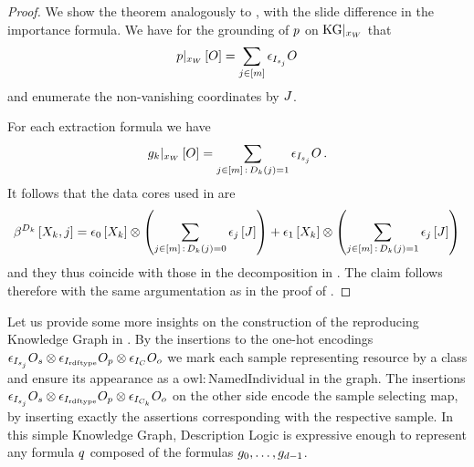 \begin{proof}
    We show the theorem analogously to , with the slide difference in the importance formula.
    We have for the grounding of $p$ on $\mathrm{KG}|_{x_{W}}$ that
    \begin{align*}
        {p}|_{x_{W}}\left[O\right] = \sum_{j\in[m]}  \epsilon_{I_{s_j}}{O}
    \end{align*}
    and enumerate the non-vanishing coordinates by $J$.

    For each extraction formula we have
    \begin{align*}
        {g_{k}}|_{x_{W}}\left[O\right] = \sum_{j\in[m] \, : \, D_{k}(j)=1} \epsilon_{I_{s_j}}{O} \,.
    \end{align*}
    It follows that the data cores used in  are
    \begin{align*}
        \beta^{D_k}\left[X_{k},j\right]
        = \epsilon_{0}\left[X_{k}\right] \otimes \left(\sum_{j\in[m] \, : \, D_{k}(j)=0} \epsilon_{j}\left[J\right]\right)
        +\epsilon_{1}\left[X_{k}\right] \otimes \left(\sum_{j\in[m] \, : \, D_{k}(j)=1} \epsilon_{j}\left[J\right]\right)
    \end{align*}
    and they thus coincide with those in the decomposition in .
    The claim follows therefore with the same argumentation as in the proof of .
\end{proof}

%
Let us provide some more insights on the construction of the reproducing Knowledge Graph in .
By the insertions to the one-hot encodings $\epsilon_{I_{s_j}}{O_{s}} \otimes \epsilon_{I_{\mathrm{rdf}\mathrm{type}}}{O_{p}} \otimes \epsilon_{I_{C}}{O_{o}}$ we mark each sample representing resource by a class and ensure its appearance as a $\mathrm{owl:NamedIndividual}$ in the graph.
The insertions $\epsilon_{I_{s_j}}{O_{s}}\otimes \epsilon_{I_{\mathrm{rdf}\mathrm{type}}}{O_{p}} \otimes \epsilon_{I_{C_k}}{O_{o}}$ on the other side encode the sample selecting map, by inserting exactly the assertions corresponding with the respective sample.
% 
In this simple Knowledge Graph, Description Logic is expressive enough to represent any formula $q$ composed of the formulas $g_{0},\ldots,g_{d-1}$.

